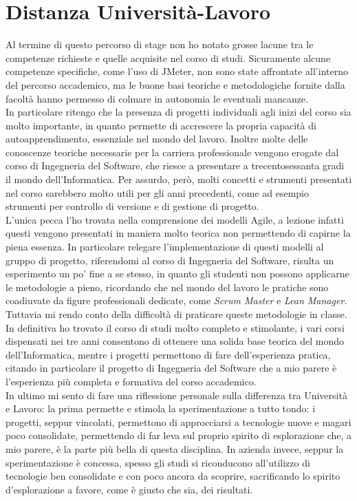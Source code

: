 \section{Distanza Università-Lavoro}
Al termine di questo percorso di stage non ho notato grosse lacune tra le competenze richieste e quelle acquisite nel corso di studi. Sicuramente alcune competenze specifiche, come l'uso di JMeter, non sono state affrontate all'interno del percorso accademico, ma le buone basi teoriche e metodologiche fornite dalla facoltà hanno permesso di colmare in autonomia le eventuali mancanze.\\
In particolare ritengo che la presenza di progetti individuali agli inizi del corso sia molto importante, in quanto permette di accrescere la propria capacità di autoapprendimento, essenziale nel mondo del lavoro. Inoltre molte delle conoscenze teoriche necessarie per la carriera professionale vengono erogate dal corso di Ingegneria del Software, che riesce a presentare a trecentosessanta gradi il mondo dell'Informatica. Per assurdo, però, molti concetti e strumenti presentati nel corso sarebbero molto utili per gli anni precedenti, come ad esempio strumenti per controllo di versione e di gestione di progetto. \\
L'unica pecca l'ho trovata nella comprensione dei modelli Agile, a lezione infatti questi vengono presentati in maniera molto teorica non permettendo di capirne la piena essenza. In particolare relegare l'implementazione di questi modelli al gruppo di progetto, riferendomi al corso di Ingegneria del Software, risulta un esperimento un po' fine a se stesso, in quanto gli studenti non possono applicarne le metodologie a pieno, ricordando che nel mondo del lavoro le pratiche sono coadiuvate da figure professionali dedicate, come \textit{Scrum Master} e \textit{Lean Manager}. Tuttavia mi rendo conto della difficoltà di praticare queste metodologie in classe.\\
In definitiva ho trovato il corso di studi molto completo e stimolante, i vari corsi dispensati nei tre anni consentono di ottenere una solida base teorica del mondo dell'Informatica, mentre i progetti permettono di fare dell'esperienza pratica, citando in particolare il progetto di Ingegneria del Software che a mio parere è l'esperienza più completa e formativa del corso accademico.\\
In ultimo mi sento di fare una riflessione personale sulla differenza tra Università e Lavoro: la prima permette e stimola la sperimentazione a tutto tondo: i progetti, seppur vincolati, permettono di approcciarsi a tecnologie nuove e magari poco consolidate, permettendo di far leva sul proprio spirito di esplorazione che, a mio parere, è la parte più bella di questa disciplina. In azienda invece, seppur la sperimentazione è concessa, spesso gli studi si riconducono all'utilizzo di tecnologie ben consolidate e con poco ancora da scoprire, sacrificando lo spirito d'esplorazione a favore, come è giusto che sia, dei risultati. 
 
